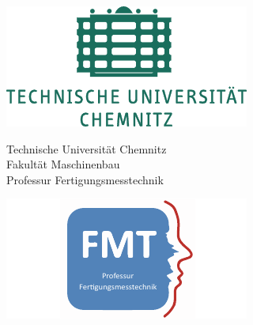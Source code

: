 \begin{titlepage}
	
\begin{figure}[htbp]
	\begin{minipage}{0.19\textwidth}
		\includegraphics[width=\textwidth]{img/logo_tuc.pdf}
	\end{minipage}
	\hfill
	\begin{minipage}{0.6\textwidth} 
		\begin{center}	
			Technische Universität Chemnitz\\
			Fakultät Maschinenbau\\
			Professur Fertigungsmesstechnik
		\end{center}
	\end{minipage}
	\hfill
	\begin{minipage}{0.19\textwidth} 
		\includegraphics[width=\textwidth]{img/logo_fmt.pdf}
	\end{minipage}
\end{figure}
	
	
	\vspace*{1cm}
		

\end{titlepage}
